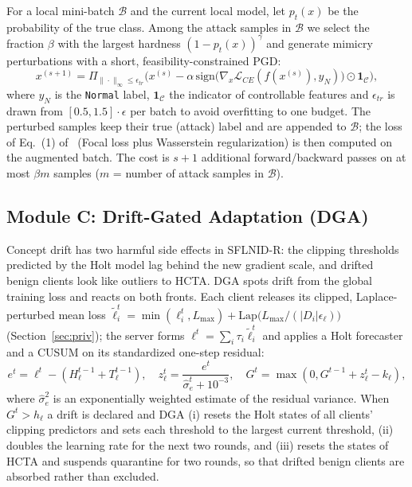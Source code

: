 \documentclass[journal]{IEEEtran}
\begin{document}
For a local mini-batch $\mathcal{B}$ and the current local model, let $p_t(x)$ be the probability of the true class. Among the attack samples in $\mathcal{B}$ we select the fraction $\beta$ with the largest hardness $(1-p_t(x))^{\gamma}$ and generate mimicry perturbations with a short, feasibility-constrained PGD:
\begin{equation}
x^{(s+1)}=\Pi_{\|\cdot\|_\infty\le\epsilon_{tr}}\Big(x^{(s)}-\alpha\,\mathrm{sign}\big(\nabla_{x}\mathcal{L}_{CE}(f(x^{(s)}),y_{N})\big)\odot\mathbf{1}_{\mathcal{C}}\Big),
\end{equation}
where $y_N$ is the \texttt{Normal} label, $\mathbf{1}_{\mathcal{C}}$ the indicator of controllable features and $\epsilon_{tr}$ is drawn from $[0.5,1.5]\cdot\epsilon$ per batch to avoid overfitting to one budget. The perturbed samples keep their true (attack) label and are appended to $\mathcal{B}$; the loss of Eq.~(1) of~\cite{sflnid} (Focal loss plus Wasserstein regularization) is then computed on the augmented batch. The cost is $s+1$ additional forward/backward passes on at most $\beta m$ samples ($m$ = number of attack samples in $\mathcal{B}$).

\subsection{Module C: Drift-Gated Adaptation (DGA)}
Concept drift has two harmful side effects in SFLNID-R: the clipping thresholds predicted by the Holt model lag behind the new gradient scale, and drifted benign clients look like outliers to HCTA. DGA spots drift from the global training loss and reacts on both fronts. Each client releases its clipped, Laplace-perturbed mean loss $\tilde\ell_i^t=\min(\ell_i^t,L_{\max})+\mathrm{Lap}\big(L_{\max}/(|D_i|\epsilon_\ell)\big)$ (Section~\ref{sec:priv}); the server forms $\ell^t=\sum_i\tau_i\tilde\ell_i^t$ and applies a Holt forecaster and a CUSUM on its standardized one-step residual:
\begin{equation}
e^t=\ell^t-(H_\ell^{t-1}+T_\ell^{t-1}),\quad z_\ell^t=\frac{e^t}{\hat\sigma_e^t+10^{-3}},\quad G^t=\max(0,G^{t-1}+z_\ell^t-k_\ell),
\end{equation}
where $\hat\sigma_e^2$ is an exponentially weighted estimate of the residual variance. When $G^t>h_\ell$ a drift is declared and DGA (i) resets the Holt states of all clients' clipping predictors and sets each threshold to the largest current threshold, (ii) doubles the learning rate for the next two rounds, and (iii) resets the states of HCTA and suspends quarantine for two rounds, so that drifted benign clients are absorbed rather than excluded.
\end{document}
